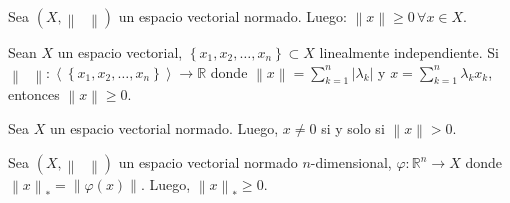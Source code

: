 \begin{prob}
    \label{prob5}
    Sea
    \begin{math}
        \left(
        X,
        \left\|
        \phantom{\cdot}
        \right\|
        \right)
    \end{math}
    un espacio vectorial normado.
    Luego:
    \begin{math}
        \left\|
        x
        \right\|\geq
        0\,\forall
        x\in X
    \end{math}.
\end{prob}

\begin{prob}
    \label{prob6}
    Sean $X$ un espacio vectorial,
    \begin{math}
        \left\{
        x_{1},
        x_{2},
        \dotsc,
        x_{n}
        \right\}\subset
        X
    \end{math}
    linealmente independiente.
    Si
    \begin{math}
        \left\|
        \phantom{\cdot}
        \right\|\colon
        \left\langle
        \left\{
        x_{1},
        x_{2},
        \dotsc,
        x_{n}
        \right\}
        \right\rangle\to
        \mathbb{R}
    \end{math}
    donde
    \begin{math}
        \left\|
        x
        \right\|=
        \sum_{k=1}^{n}
        \left|
        \lambda_{k}
        \right|
    \end{math}
    y
    \begin{math}
        x=
        \sum_{k=1}^{n}
        \lambda_{k}x_{k}
    \end{math},
    entonces
    \begin{math}
        \left\|
        x
        \right\|\geq
        0
    \end{math}.
\end{prob}

\begin{prob}
    \label{prob7}
    Sea $X$ un espacio vectorial normado.
    Luego, $x\neq 0$ si y solo si $\left\|x\right\|>0$.
\end{prob}

\begin{prob}
    \label{prob8}
    Sea
    \begin{math}
        \left(
        X,
        \left\|
        \phantom{\cdot}
        \right\|
        \right)
    \end{math}
    un espacio vectorial normado $n$-dimensional,
    \begin{math}
        \varphi\colon
        \mathbb{R}^{n}\to
        X
    \end{math}
    donde
    \begin{math}
        {\left\|x\right\|}_{\ast}=
        \left\|
        \varphi
        \left(
        x
        \right)
        \right\|
    \end{math}.
    Luego,
    \begin{math}
        {\left\|x\right\|}_{\ast}\geq
        0
    \end{math}.
\end{prob}

